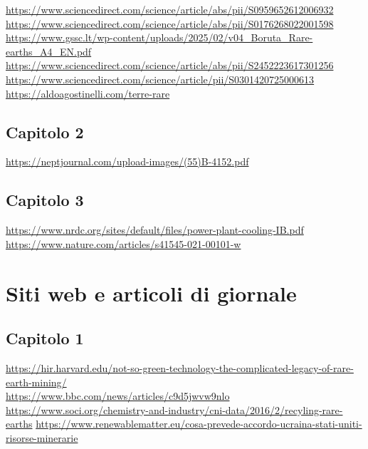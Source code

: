 \documentclass[12pt,a4paper,oneside]{book}
\begin{document}
\url{https://www.sciencedirect.com/science/article/abs/pii/S0959652612006932} \\
\url{https://www.sciencedirect.com/science/article/abs/pii/S0176268022001598} \\
\url{https://www.gssc.lt/wp-content/uploads/2025/02/v04_Boruta_Rare-earths_A4_EN.pdf} \\
\url{https://www.sciencedirect.com/science/article/abs/pii/S2452223617301256} \\
\url{https://www.sciencedirect.com/science/article/pii/S0301420725000613}\\
\url{https://aldoagostinelli.com/terre-rare}

\subsection*{Capitolo 2}
\url{https://neptjournal.com/upload-images/(55)B-4152.pdf}

\subsection*{Capitolo 3}
\url{https://www.nrdc.org/sites/default/files/power-plant-cooling-IB.pdf}\\
\url{https://www.nature.com/articles/s41545-021-00101-w}

\section*{Siti web e articoli di giornale}
\subsection*{Capitolo 1}
\url{https://hir.harvard.edu/not-so-green-technology-the-complicated-legacy-of-rare-earth-mining/} \\
\url{https://www.bbc.com/news/articles/c9d5jwvw9nlo} \\
\url{https://www.soci.org/chemistry-and-industry/cni-data/2016/2/recyling-rare-earths}
\url{https://www.renewablematter.eu/cosa-prevede-accordo-ucraina-stati-uniti-risorse-minerarie}
\end{document}
